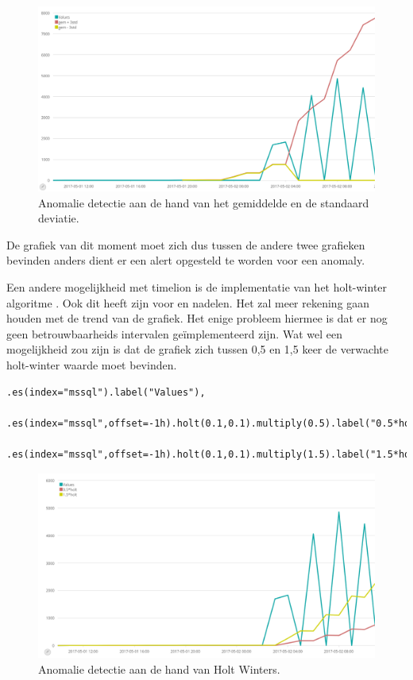 \begin{figure}[h]
	\includegraphics[width=16cm]{img/avg3std}
	\caption{Anomalie detectie aan de hand van het gemiddelde en de standaard deviatie.}
	\label{fig:avg3std}
\end{figure}

De grafiek van dit moment moet zich dus tussen de andere twee grafieken bevinden anders dient er een alert opgesteld te worden voor een anomaly.


Een andere mogelijkheid met timelion is de implementatie van het holt-winter algoritme \autocite{holtwinters}.
Ook dit heeft zijn voor en nadelen. Het zal meer rekening gaan houden met de trend van de grafiek. Het enige probleem hiermee is dat er nog geen betrouwbaarheids intervalen geïmplementeerd zijn.
Wat wel een mogelijkheid zou zijn is dat de grafiek zich tussen 0,5 en 1,5 keer de verwachte holt-winter waarde moet bevinden.
\lstset{escapechar=@,style=customc}        
\begin{lstlisting}[frame=single]  
	.es(index="mssql").label("Values"),
	.es(index="mssql",offset=-1h).holt(0.1,0.1).multiply(0.5).label("0.5*holt"),
	.es(index="mssql",offset=-1h).holt(0.1,0.1).multiply(1.5).label("1.5*holt")
\end{lstlisting}

\begin{figure}[h]
	\includegraphics[width=16cm]{img/holtwinters}
	\caption{Anomalie detectie aan de hand van Holt Winters.}
	\label{fig:holtwinters}
\end{figure}


